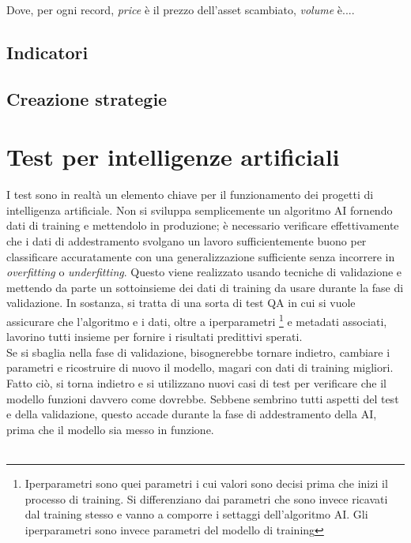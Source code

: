 \documentclass[a4paper,12pt]{report}
\begin{document}
Dove, per ogni record, \textit{price} è il prezzo dell'asset scambiato, \textit{volume} è....



\section{Indicatori}

\section{Creazione strategie}

\newpage
\chapter{Test per intelligenze artificiali}	
\label{cap4}

I test sono in realtà un elemento chiave per il funzionamento dei progetti di intelligenza artificiale. Non si sviluppa semplicemente un algoritmo AI fornendo dati di training e mettendolo in produzione; è necessario verificare effettivamente che i dati di addestramento svolgano un lavoro sufficientemente buono per classificare accuratamente con una generalizzazione sufficiente senza incorrere in \textit{overfitting} o \textit{underfitting}. Questo viene realizzato usando tecniche di validazione e mettendo da parte un sottoinsieme dei dati di training da usare durante la fase di validazione. In sostanza, si tratta di una sorta di test QA in cui si vuole assicurare che l'algoritmo e i dati, oltre a iperparametri \footnote{Iperparametri sono quei parametri i cui valori sono decisi prima che inizi il processo di training. Si differenziano dai parametri che sono invece ricavati dal training stesso e vanno a comporre i settaggi dell'algoritmo AI. Gli iperparametri sono invece parametri del modello di training} e metadati associati, lavorino tutti insieme per fornire i risultati predittivi sperati.\\
Se si sbaglia nella fase di validazione, bisognerebbe tornare indietro, cambiare i parametri e ricostruire di nuovo il modello, magari con dati di training migliori. Fatto ciò, si torna indietro e si utilizzano nuovi casi di test per verificare che il modello funzioni davvero come dovrebbe. Sebbene sembrino tutti aspetti del test e della validazione, questo accade durante la fase di addestramento della AI, prima che il modello sia messo in funzione.\\~\\
\end{document}
